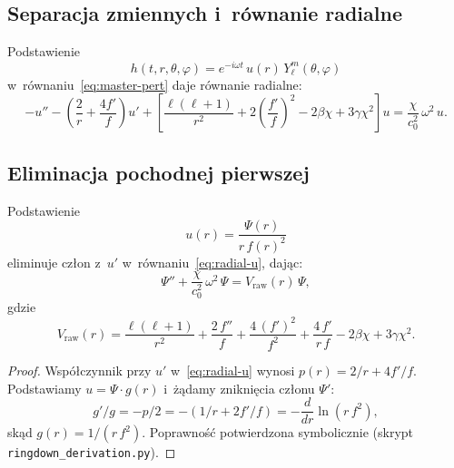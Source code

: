 \subsection{Separacja zmiennych i~r\'ownanie radialne}

\begin{proposition}\label{prop:separation}
Podstawienie
\begin{equation}
  h(t,r,\theta,\varphi) = e^{-i\omega t}\,u(r)\,Y_\ell^m(\theta,\varphi)
\end{equation}
w~r\'ownaniu~\eqref{eq:master-pert} daje r\'ownanie radialne:
\begin{equation}\label{eq:radial-u}
  -u'' - \left(\frac{2}{r} + \frac{4f'}{f}\right) u'
  + \left[\frac{\ell(\ell+1)}{r^2}
    + 2\!\left(\frac{f'}{f}\right)^{\!2}
    - 2\beta\chi + 3\gamma\chi^2
  \right] u
  = \frac{\chi}{c_0^2}\,\omega^2\,u.
\end{equation}
\end{proposition}

\subsection{Eliminacja pochodnej pierwszej}

\begin{lemma}\label{lem:weight}
Podstawienie
\begin{equation}\label{eq:weight-sub}
  u(r) = \frac{\Psi(r)}{r\,f(r)^2}
\end{equation}
eliminuje cz\l{}on z~$u'$ w~r\'ownaniu~\eqref{eq:radial-u},
daj\k{a}c:
\begin{equation}\label{eq:psi-eq}
  \Psi'' + \frac{\chi}{c_0^2}\,\omega^2\,\Psi
  = V_{\mathrm{raw}}(r)\,\Psi,
\end{equation}
gdzie
\begin{equation}\label{eq:V-raw}
  V_{\mathrm{raw}}(r)
  = \frac{\ell(\ell+1)}{r^2}
    + \frac{2\,f''}{f}
    + \frac{4\,(f')^2}{f^2}
    + \frac{4\,f'}{r\,f}
    - 2\beta\chi + 3\gamma\chi^2.
\end{equation}
\end{lemma}

\begin{proof}
Wsp\'o\l{}czynnik przy $u'$ w~\eqref{eq:radial-u} wynosi
$p(r) = 2/r + 4f'/f$. Podstawiamy $u = \Psi\cdot g(r)$
i~\.z\k{a}damy znikni\k{e}cia cz\l{}onu $\Psi'$:
\begin{equation}
  g'/g = -p/2 = -(1/r + 2f'/f) = -\frac{d}{dr}\ln(r\,f^2),
\end{equation}
sk\k{a}d $g(r) = 1/(r\,f^2)$.
Poprawno\'s\'c potwierdzona symbolicznie
(skrypt \texttt{ringdown\_derivation.py}).
\end{proof}

